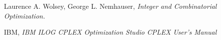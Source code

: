 \documentclass[12pt]{article}
\newenvironment{code}{\captionsetup{type=listing}}{}
\begin{document}
\begin{code}
\small
{}

\end{code}

\begin{code}
\small
{}

\end{code}

\begin{code}
\small
{}

\end{code}


\newpage
\begin{thebibliography}{9}
Laurence A. Wolsey, George L. Nemhauser, \emph{Integer and Combinatorial Optimization.}

IBM, \emph{IBM ILOG CPLEX Optimization Studio
CPLEX User’s Manual}
\end{thebibliography}
\end{document}
